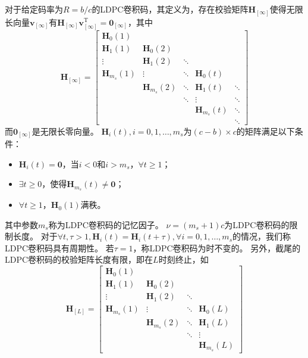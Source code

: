 对于给定码率为$R=b/c$的LDPC卷积码，其定义为，存在校验矩阵$\mathbf{H}_{[\infty]}$使得无限长向量$\mathbf{v}_{[\infty]}$有$\mathbf{H}_{[\infty]}\mathbf{v}_{[\infty]}^\text{T} =\mathbf{0}_{[\infty]}$，其中
\begin{equation}
    \mathbf{H}_{[\infty]} = \left[
          \begin{array}{ccccc}
            \mathbf{H}_0(1) & & & & \\
            \mathbf{H}_1(1) & \mathbf{H}_0(2) & & & \\
            \vdots & \mathbf{H}_1(2) & \ddots & & \\
            \mathbf{H}_{m_s}(1) & \vdots & \ddots & \mathbf{H}_0(t) & \\
             & \mathbf{H}_{m_s}(2) & \ddots & \mathbf{H}_1(t) & \ddots\\
             & & \ddots & \vdots & \ddots \\
             & & & \mathbf{H}_{m_s}(t) & \ddots \\
             & & & & \ddots
          \end{array} \right]
\end{equation}
而$\mathbf{0}_{[\infty]}$是无限长零向量。
$\mathbf{H}_i(t),i=0,1,\dots,m_s$为$(c-b)\times c$的矩阵满足以下条件：
\begin{itemize}
\item $\mathbf{H}_i(t)=\mathbf{0}$，当$i<0$和$i>m_s$，$\forall t \geq 1$；
\item $\exists t\geq 0$，使得$\mathbf{H}_{m_s}(t) \neq \mathbf{0}$；
\item $\forall t \geq 1$，$\mathbf{H}_0(1)$满秩。
\end{itemize}
其中参数$m_s$称为LDPC卷积码的记忆因子。
$\nu = (m_s+1)c$为LDPC卷积码的限制长度。
对于$\forall t,\tau>1,\mathbf{H}_i(t) = \mathbf{H}_i(t+\tau),\forall i = 0,1,\dots,m_s$的情况，我们称LDPC卷积码具有周期性。
若$\tau=1$，称LDPC卷积码为时不变的。
另外，截尾的LDPC卷积码的校验矩阵长度有限，即在$L$时刻终止，如
\begin{equation}
    \mathbf{H}_{[L]} = \left[
          \begin{array}{cccc}
            \mathbf{H}_0(1) & & & \\
            \mathbf{H}_1(1) & \mathbf{H}_0(2) & & \\
            \vdots & \mathbf{H}_1(2) & \ddots & \\
            \mathbf{H}_{m_s}(1) & \vdots & \ddots & \mathbf{H}_0(L) \\
             & \mathbf{H}_{m_s}(2) & \ddots & \mathbf{H}_1(L) \\
             & & \ddots & \vdots \\
             & & & \mathbf{H}_{m_s}(L)
          \end{array} \right]
\end{equation}

